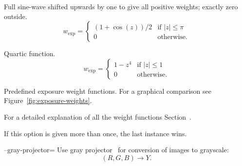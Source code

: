 \begin{codelist}
\begin{table}[htbp]
\begin{codelist}
    \item[\itempar{fullsine \\ full-sine}]\itemend Full sine-wave
      shifted upwards by one to give all positive weights; exactly
      zero outside.
      \begin{equation}\label{equ:weight:fullsine}
      w_{\mathrm{exp}} =
      \left\{\begin{array}{cl}
      (1 + \cos(z)) / 2 & \mbox{if } |z| \leq \pi \\
      0                 & \mbox{otherwise.}
      \end{array} \right.
      \end{equation}

      \item[\itempar{bisquare \\ bi-square}]\itemend Quartic function.
      \begin{equation}\label{equ:weight:bisquare}
      w_{\mathrm{exp}} =
      \left\{
      \begin{array}{cl}
        1 - z^4 & \mbox{if } |z| \leq 1 \\
        0       & \mbox{otherwise.}
      \end{array}
      \right.
      \end{equation}
    \end{codelist}

    \caption[Exposure weight functions]{Predefined exposure weight
      functions.  For a graphical comparison see
      Figure~\ref{fig:exposure-weights}.\label{tab:exposure-weight-functions}}

  \end{table}

  For a detailed explanation of all the weight functions
  Section~.

  If this option is given more than once, the last instance wins.


  \label{opt:gray-projector}%
\item[--gray-projector=\metavar{PROJECTOR}]\itemend Use gray
  projector~ for conversion of  images
  to grayscale:
  \[
  (R, G, B) \rightarrow Y.
  \]


\end{codelist}
